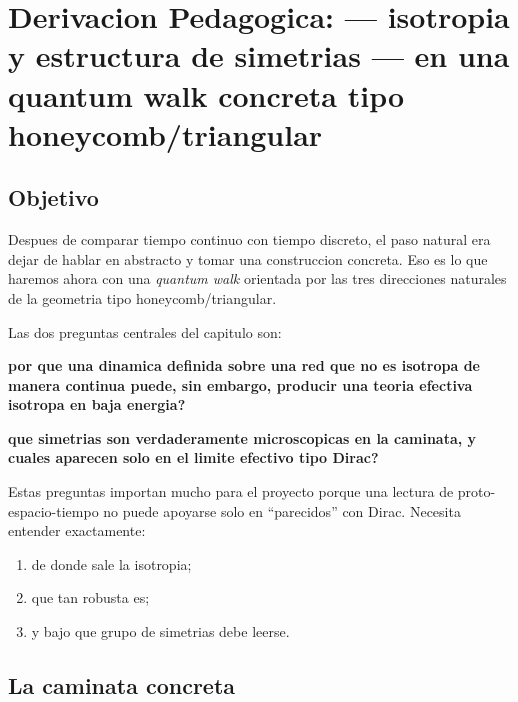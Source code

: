 \chapter{Derivacion Pedagogica: --- isotropia y estructura de simetrias --- en una quantum walk concreta tipo honeycomb/triangular}
\label{ch:isotropia-qw-honeycomb}







\section{Objetivo}
Despues de comparar tiempo continuo con tiempo discreto, el paso natural era dejar de hablar en abstracto y tomar una construccion concreta. Eso es lo que haremos ahora con una \textit{quantum walk} orientada por las tres direcciones naturales de la geometria tipo honeycomb/triangular.

Las dos preguntas centrales del capitulo son:
\begin{displayquote}
\textbf{por que una dinamica definida sobre una red que no es isotropa de manera continua puede, sin embargo, producir una teoria efectiva isotropa en baja energia?}
\end{displayquote}
\begin{displayquote}
\textbf{que simetrias son verdaderamente microscopicas en la caminata, y cuales aparecen solo en el limite efectivo tipo Dirac?}
\end{displayquote}

Estas preguntas importan mucho para el proyecto porque una lectura de proto-espacio-tiempo no puede apoyarse solo en \enquote{parecidos} con Dirac. Necesita entender exactamente:
\begin{enumerate}[label=\arabic*.]
    \item de donde sale la isotropia;
    \item que tan robusta es;
    \item y bajo que grupo de simetrias debe leerse.
\end{enumerate}

\section{La caminata concreta}
